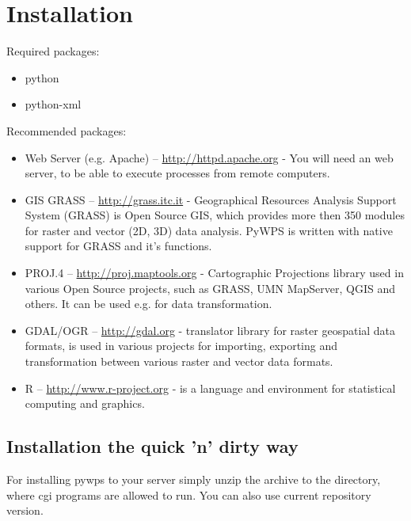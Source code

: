 \documentclass[a4paper,11pt]{article}
\begin{document}
\section{Installation}
    
Required packages:
    
\begin{itemize}
    \item python 
    \item python-xml 
\end{itemize}
    
Recommended packages:
    
\begin{itemize}
    \item Web Server (e.g. Apache) -- \url{http://httpd.apache.org} -  You
    will need an web server, to be able to execute processes from remote
    computers.

    \item GIS GRASS  -- \url{http://grass.itc.it} - Geographical Resources
    Analysis Support System (GRASS) is Open Source GIS, which provides more
    then 350 modules for raster and vector (2D, 3D) data analysis. PyWPS is
    written with native support for GRASS and it's functions.

    \item PROJ.4  -- \url{http://proj.maptools.org} - Cartographic
    Projections library used in various Open Source projects, such as
    GRASS, UMN MapServer, QGIS and others. It can be used e.g. for data
    transformation.

    \item GDAL/OGR  -- \url{http://gdal.org} - translator library for
    raster geospatial data formats, is used in various projects for
    importing, exporting and transformation between various raster and vector
    data formats.

    \item R  -- \url{http://www.r-project.org} - is a language and environment
    for statistical computing and graphics.

\end{itemize}
    
\subsection{Installation the quick 'n' dirty way}
For installing pywps to your server simply unzip the archive to the
directory, where cgi programs are allowed to run. You can also use current
repository version.
\end{document}
